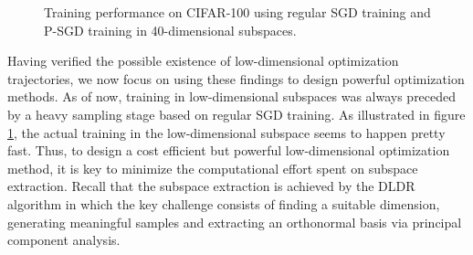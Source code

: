 \documentclass[11pt, a4paper]{article}
\begin{document}
\begin{figure}[!h]
\centering
{} \vspace{15pt}
\caption{\centering Training performance on CIFAR-100 using regular SGD training and P-SGD training in 40-dimensional subspaces.}
\label{fig:exp1}
\end{figure}

Having verified the possible existence of low-dimensional optimization trajectories, we now focus on using these findings to design powerful optimization methods. As of now, training in low-dimensional subspaces was always preceded by a heavy sampling stage based on regular SGD training. As illustrated in figure \ref{fig:exp1}, the actual training in the low-dimensional subspace seems to happen pretty fast. Thus, to design a cost efficient but powerful low-dimensional optimization method, it is key to minimize the computational effort spent on subspace extraction. Recall that the subspace extraction is achieved by the DLDR algorithm in which the key challenge consists of finding a suitable dimension, generating meaningful samples and extracting an orthonormal basis via principal component analysis. \\
\end{document}
